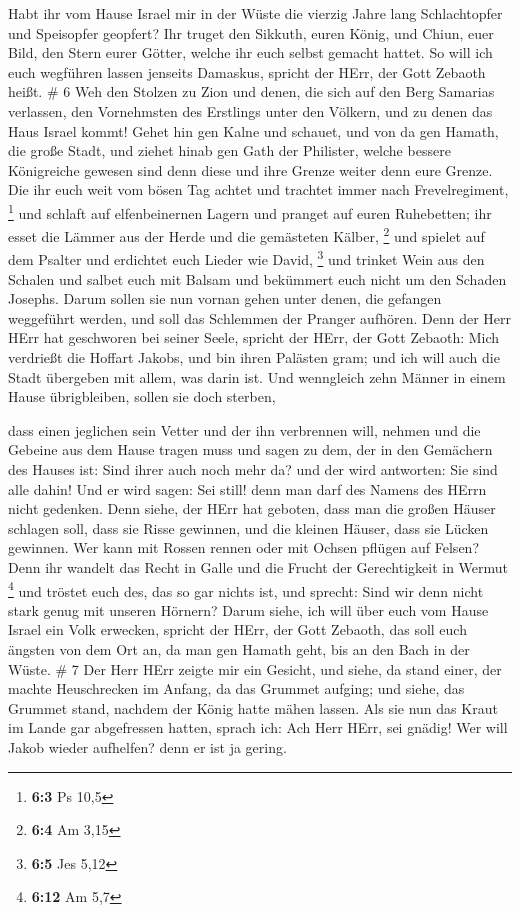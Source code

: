  Habt ihr vom Hause Israel mir in der Wüste die vierzig
Jahre lang Schlachtopfer und Speisopfer geopfert?  Ihr
truget den Sikkuth, euren König, und Chiun, euer Bild, den Stern eurer
Götter, welche ihr euch selbst gemacht hattet.  So will ich
euch wegführen lassen jenseits Damaskus, spricht der HErr, der Gott
Zebaoth heißt. \# 6  Weh den Stolzen zu Zion und denen, die
sich auf den Berg Samarias verlassen, den Vornehmsten des Erstlings
unter den Völkern, und zu denen das Haus Israel kommt! 
Gehet hin gen Kalne und schauet, und von da gen Hamath, die große Stadt,
und ziehet hinab gen Gath der Philister, welche bessere Königreiche
gewesen sind denn diese und ihre Grenze weiter denn eure Grenze.
 Die ihr euch weit vom bösen Tag achtet und trachtet immer
nach Frevelregiment, \footnote{\textbf{6:3} Ps 10,5}  und
schlaft auf elfenbeinernen Lagern und pranget auf euren Ruhebetten; ihr
esset die Lämmer aus der Herde und die gemästeten Kälber, \footnote{\textbf{6:4}
  Am 3,15}  und spielet auf dem Psalter und erdichtet euch
Lieder wie David, \footnote{\textbf{6:5} Jes 5,12}  und
trinket Wein aus den Schalen und salbet euch mit Balsam und bekümmert
euch nicht um den Schaden Josephs.  Darum sollen sie nun
vornan gehen unter denen, die gefangen weggeführt werden, und soll das
Schlemmen der Pranger aufhören.  Denn der Herr HErr hat
geschworen bei seiner Seele, spricht der HErr, der Gott Zebaoth: Mich
verdrießt die Hoffart Jakobs, und bin ihren Palästen gram; und ich will
auch die Stadt übergeben mit allem, was darin ist.  Und
wenngleich zehn Männer in einem Hause übrigbleiben, sollen sie doch
sterben,

 dass einen jeglichen sein Vetter und der ihn verbrennen
will, nehmen und die Gebeine aus dem Hause tragen muss und sagen zu dem,
der in den Gemächern des Hauses ist: Sind ihrer auch noch mehr da? und
der wird antworten: Sie sind alle dahin! Und er wird sagen: Sei still!
denn man darf des Namens des HErrn nicht gedenken.  Denn
siehe, der HErr hat geboten, dass man die großen Häuser schlagen soll,
dass sie Risse gewinnen, und die kleinen Häuser, dass sie Lücken
gewinnen.  Wer kann mit Rossen rennen oder mit Ochsen
pflügen auf Felsen? Denn ihr wandelt das Recht in Galle und die Frucht
der Gerechtigkeit in Wermut \footnote{\textbf{6:12} Am 5,7}
 und tröstet euch des, das so gar nichts ist, und sprecht:
Sind wir denn nicht stark genug mit unseren Hörnern?  Darum
siehe, ich will über euch vom Hause Israel ein Volk erwecken, spricht
der HErr, der Gott Zebaoth, das soll euch ängsten von dem Ort an, da man
gen Hamath geht, bis an den Bach in der Wüste. \# 7  Der
Herr HErr zeigte mir ein Gesicht, und siehe, da stand einer, der machte
Heuschrecken im Anfang, da das Grummet aufging; und siehe, das Grummet
stand, nachdem der König hatte mähen lassen.  Als sie nun
das Kraut im Lande gar abgefressen hatten, sprach ich: Ach Herr HErr,
sei gnädig! Wer will Jakob wieder aufhelfen? denn er ist ja gering.

